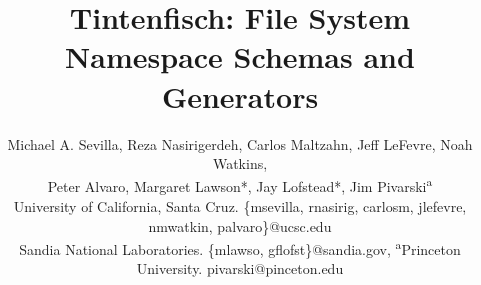 \documentclass[letterpaper,twocolumn,10pt]{article}
\begin{document}
\date{}

\title{Tintenfisch: File System Namespace Schemas and Generators\vspace{-1em}}

\author{
{\rm Michael A. Sevilla, Reza Nasirigerdeh, Carlos Maltzahn, Jeff LeFevre, Noah Watkins,}\\
{\rm Peter Alvaro, Margaret Lawson*, Jay Lofstead*, Jim Pivarski\textsuperscript{a}}\\
{\small University of California, Santa Cruz. \{msevilla, rnasirig, carlosm, jlefevre, nmwatkin, palvaro\}@ucsc.edu}\\
{\small *Sandia National Laboratories. \{mlawso, gflofst\}@sandia.gov, \textsuperscript{a}Princeton University. pivarski@pinceton.edu}
} %

\maketitle




%





{\footnotesize 
}
\end{document}
